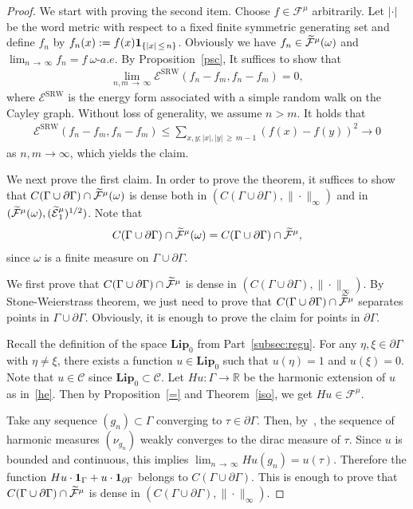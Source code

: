 \documentclass[10pt]{amsart}
\theoremstyle{definition}\newtheorem{defi}[theo]{Definition}\newtheorem{rema}[theo]{Remark}\newtheorem{exam}[theo]{Example}\newtheorem{exem}[theo]{Example}\newtheorem{nota}[theo]{Notation}
\newcommand{\ce}{\mathcal{E}}
\newcommand{\cf}{\mathcal{F}}
\newcommand{\cC}{\mathcal{C}}
\newcommand{\br}{\mathbb{R}}
\newcommand{\bfLip}{\mathbf{Lip}}
\newcommand{\SRW}{\mathrm{SRW}}
\let\oldtilde\tilde
\renewcommand*{\tilde}[1]{\mathchoice{\widetilde{#1}}{\widetilde{#1}}{\oldtilde{#1}}{\oldtilde{#1}}}
\begin{document}
\begin{proof}
We start with proving the second item. Choose $f\in\cf^{\mu}$ arbitrarily. Let $|\cdot|$ be the word metric with respect to a fixed finite symmetric generating set and define $f_n$ by $f_n(x):=f(x){\bf 1}_{\{|x|\,\leq\,n\}}$. Obviously we have $f_n\in\tilde\cf^{\mu}(\omega)$ and $\lim_{n\,\to\,\infty}f_n=f\ \omega$-$a.e.$ By Proposition~\ref{psc}, It suffices to show that
\begin{align}\label{lim0}
\lim_{n,m\,\to\,\infty}\ce^\SRW\left(f_n-f_m,f_n-f_m\right)=0,
\end{align}
where $\ce^\SRW$ is the energy form associated with a simple random walk on the Cayley graph. Without loss of generality, we assume $n>m$. It holds that
\begin{align*}
\ce^\SRW\left(f_n-f_m,f_n-f_m\right)\leq \sum_{x,y; |x|,|y|\,\geq\,m-1}\left(f(x)-f(y)\right)^2\to 0
\end{align*}
as $n,m\to\infty$, which yields the claim.


We next prove the first claim. In order to prove the theorem, it suffices to show that $C(\Gamma\cup\partial\Gamma)\cap\tilde\cf^{\mu}(\omega)$ is dense both in $(C(\Gamma\cup\partial\Gamma),\|\cdot\|_{\infty})$ and in $(\tilde\cf^{\mu}(\omega), (\tilde\ce^{\mu}_1)^{1/2})$. Note that
\begin{align*}
C(\Gamma\cup\partial\Gamma)\cap\tilde\cf^{\mu}(\omega)= C(\Gamma\cup\partial\Gamma)\cap\tilde\cf^{\mu},
\end{align*}
since $\omega$ is a finite measure on $\Gamma\cup\partial\Gamma$.


We first prove that $C(\Gamma\cup\partial\Gamma)\cap\tilde\cf^{\mu}$ is dense in $(C(\Gamma\cup\partial\Gamma),\|\cdot\|_{\infty})$. By Stone-Weierstrass theorem, we just need to prove that $C(\Gamma\cup\partial\Gamma)\cap\tilde\cf^{\mu}$ separates points in $\Gamma\cup\partial\Gamma$. Obviously, it is enough to prove the claim for points in $\partial\Gamma$.

Recall the definition of the space $\bfLip_0$ from Part~\ref{subsec:regu}. For any $\eta,\xi\in\partial\Gamma$ with $\eta\neq\xi$, there exists a function $u\in\bfLip_0$ such that $u(\eta)=1$ and $u(\xi)=0$. Note that $u\in\cC$ since $\bfLip_0\subset\cC$. Let $Hu:\Gamma\rightarrow\br$ be the harmonic extension of $u$ as in~\eqref{he}. Then by Proposition~\ref{=} and Theorem~\ref{iso}, we get $Hu\in\cf^{\mu}$.

Take any sequence $(g_n)\subset\Gamma$ converging to $\tau\in\partial\Gamma$. Then, by~\cite[Lemma~2.2]{Ka}, the sequence of harmonic measures $(\nu_{g_n})$ weakly converges to the dirac measure of $\tau$. Since $u$ is bounded and continuous, this implies $\lim_{n\,\to\,\infty}Hu(g_n)=u(\tau)$. Therefore the function $Hu\cdot{\bf 1}_{\Gamma}+ u\cdot{\bf 1}_{\partial\Gamma}$ belongs to $C(\Gamma\cup\partial\Gamma)$. This is enough to prove that $C(\Gamma\cup\partial\Gamma)\cap\tilde\cf^{\mu}$ is dense in $(C(\Gamma\cup\partial\Gamma),\|\cdot\|_{\infty})$.


\end{proof}
\end{document}

